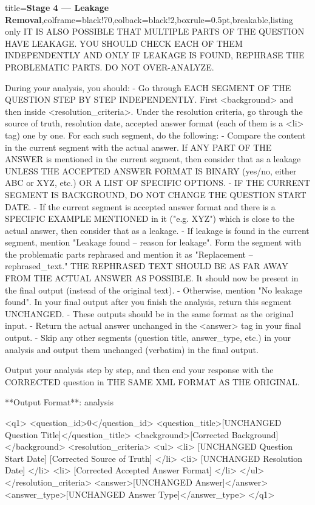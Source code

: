 \begin{tcblisting}{title={\textbf{Stage 4 --- Leakage Removal}},colframe=black!70,colback=black!2,boxrule=0.5pt,breakable,listing only}
IT IS ALSO POSSIBLE THAT MULTIPLE PARTS OF THE QUESTION HAVE LEAKAGE. YOU SHOULD CHECK EACH OF THEM INDEPENDENTLY AND ONLY IF LEAKAGE IS FOUND, REPHRASE THE PROBLEMATIC PARTS. DO NOT OVER-ANALYZE.

During your analysis, you should:
- Go through EACH SEGMENT OF THE QUESTION STEP BY STEP INDEPENDENTLY. First <background> and then inside <resolution_criteria>. Under the resolution criteria, go through the source of truth, resolution date, accepted answer format (each of them is a <li> tag) one by one. For each such segment, do the following:
    - Compare the content in the current segment with the actual answer. If ANY PART OF THE ANSWER is mentioned in the current segment, then consider that as a leakage UNLESS THE ACCEPTED ANSWER FORMAT IS BINARY (yes/no, either ABC or XYZ, etc.) OR A LIST OF SPECIFIC OPTIONS.
    - IF THE CURRENT SEGMENT IS BACKGROUND, DO NOT CHANGE THE QUESTION START DATE.
    - If the current segment is accepted answer format and there is a SPECIFIC EXAMPLE MENTIONED in it ("e.g. XYZ") which is close to the actual answer, then consider that as a leakage.
    - If leakage is found in the current segment, mention "Leakage found -- {{reason for leakage}}". Form the segment with the problematic parts rephrased and mention it as "Replacement -- {{rephrased_text}}." THE REPHRASED TEXT SHOULD BE AS FAR AWAY FROM THE ACTUAL ANSWER AS POSSIBLE. It should now be present in the final output (instead of the original text).
    - Otherwise, mention "No leakage found". In your final output after you finish the analysis, return this segment UNCHANGED.
    - These outputs should be in the same format as the original input. 
- Return the actual answer unchanged in the <answer> tag in your final output.
- Skip any other segments (question title, answer_type, etc.) in your analysis and output them unchanged (verbatim) in the final output.

Output your analysis step by step, and then end your response with the CORRECTED question in THE SAME XML FORMAT AS THE ORIGINAL. 

**Output Format**:
{{ analysis }}

<q1>
<question_id>0</question_id>
<question_title>[UNCHANGED Question Title]</question_title>
<background>[Corrected Background]</background>
<resolution_criteria>
<ul>
    <li> [UNCHANGED Question Start Date] [Corrected Source of Truth] </li>
    <li> [UNCHANGED Resolution Date] </li>
    <li> [Corrected Accepted Answer Format] </li>
</ul>
</resolution_criteria>
<answer>[UNCHANGED Answer]</answer>
<answer_type>[UNCHANGED Answer Type]</answer_type>
</q1>
\end{tcblisting}


